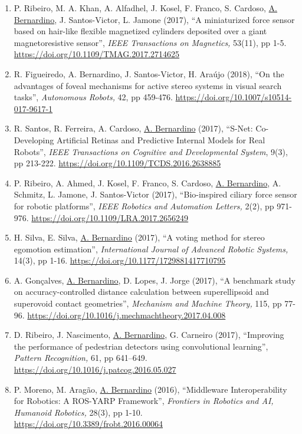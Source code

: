 \documentclass[
]{article}
\begin{document}
\begin{enumerate}
\item
  P. Ribeiro, M. A. Khan, A. Alfadhel, J. Kosel, F. Franco, S. Cardoso,
  \ul{A. Bernardino}, J. Santos-Victor, L. Jamone (2017), ``A
  miniaturized force sensor based on hair-like flexible magnetized
  cylinders deposited over a giant magnetoresistive sensor'', \emph{IEEE
  Transactions on Magnetics,} 53(11), pp 1-5.
  \url{https://doi.org/10.1109/TMAG.2017.2714625}~
\item
  R. Figueiredo, A. Bernardino, J. Santos-Victor, H. Araújo (2018), ``On
  the advantages of foveal mechanisms for active stereo systems in
  visual search tasks'', \emph{Autonomous Robots,} 42, pp 459-476.
  \url{https://doi.org/10.1007/s10514-017-9617-1}~
\item
  R. Santos, R. Ferreira, A. Cardoso, \ul{A. Bernardino} (2017),
  ``S-Net: Co-Developing Artificial Retinas and Predictive Internal
  Models for Real Robots'', \emph{IEEE Transactions on Cognitive and
  Developmental System}, 9(3), pp 213-222.
  \url{https://doi.org/10.1109/TCDS.2016.2638885}~
\item
  P. Ribeiro, A. Ahmed, J. Kosel, F. Franco, S. Cardoso, \ul{A.
  Bernardino}, A. Schmitz, L. Jamone, J. Santos-Victor (2017),
  ``Bio-inspired ciliary force sensor for robotic platforms'',
  \emph{IEEE Robotics and Automation Letters,} 2(2), pp 971-976.
  \url{https://doi.org/10.1109/LRA.2017.2656249}~
\item
  H. Silva, E. Silva, \ul{A. Bernardino} (2017), ``A voting method for
  stereo egomotion estimation'', \emph{International Journal of Advanced
  Robotic Systems,} 14(3), pp 1-16.
  \url{https://doi.org/10.1177/1729881417710795}~
\item
  A. Gonçalves, \ul{A. Bernardino}, D. Lopes, J. Jorge (2017), ``A
  benchmark study on accuracy-controlled distance calculation between
  superellipsoid and superovoid contact geometries'', \emph{Mechanism
  and Machine Theory,} 115, pp 77-96.
  \url{https://doi.org/10.1016/j.mechmachtheory.2017.04.008}~
\item
  D. Ribeiro, J. Nascimento, \ul{A. Bernardino}, G. Carneiro (2017),
  ``Improving the performance of pedestrian detectors using
  convolutional learning'', \emph{Pattern Recognition,} 61, pp 641--649.
  \url{https://doi.org/10.1016/j.patcog.2016.05.027}
\item
  P. Moreno, M. Aragão, \ul{A. Bernardino} (2016), ``Middleware
  Interoperability for Robotics: A ROS-YARP Framework'', \emph{Frontiers
  in Robotics and AI, Humanoid Robotics,} 28(3), pp 1-10.
  \url{https://doi.org/10.3389/frobt.2016.00064}~

\end{enumerate}
\end{document}
